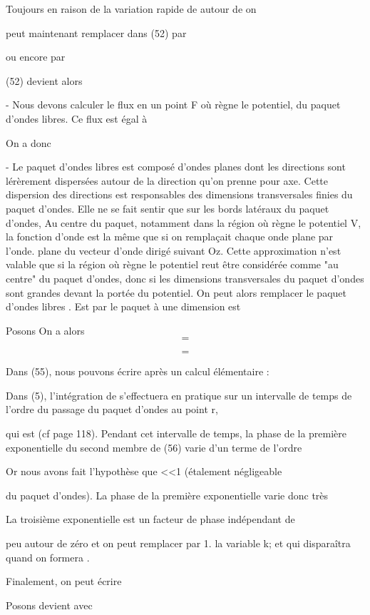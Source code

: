 Toujours en raison de la variation rapide de  autour de  on

peut maintenant remplacer dans (52)  par

ou encore par

(52) devient alors


- Nous devons calculer le flux en un point F où règne le potentiel, du
paquet d'ondes libres. Ce flux  est égal à 

On a donc

- Le paquet d'ondes libres  est composé d'ondes planes  dont
les directions sont lérèrement dispersées autour de la direction  qu'on
prenne pour axe. Cette dispersion des directions est responsables des
dimensions transversales finies du paquet d'ondes. Elle ne se fait sentir
que sur les bords latéraux du paquet d'ondes, Au centre du paquet, notamment
dans la région où règne le potentiel V, la fonction d'onde est la
même que si on remplaçait chaque onde plane  par l'onde. plane du
vecteur d'onde  dirigé suivant Oz. Cette approximation n'est valable que
si la région où règne le potentiel reut être considérée comme "au centre"
du paquet d'ondes, donc si les dimensions transversales du paquet d'ondes
sont grandes devant la portée du potentiel. On peut alors remplacer le paquet d'ondes libres . Est
par le paquet à une dimension est

Posons
On a alors
\[
\tag{55}=
\]

\[
\tag{56}=
\]


Dans (55), nous pouvons écrire après un calcul élémentaire :

Dans (5), l'intégration de  s'effectuera en pratique sur un
intervalle de temps de l'ordre du passage du paquet d'ondes au point r,

qui est (cf page 118).
Pendant cet intervalle de temps, la phase de la première exponentielle du
second membre de (56) varie d'un terme de l'ordre

Or nous avons fait l'hypothèse que <<1 (étalement négligeable

du paquet d'ondes). La phase de la première exponentielle varie donc très

La troisième exponentielle est un facteur de phase indépendant de

peu autour de zéro et on peut remplacer  par 1.
la variable k; et qui disparaîtra quand on formera .

Finalement, on peut écrire

Posons 
 devient  avec

